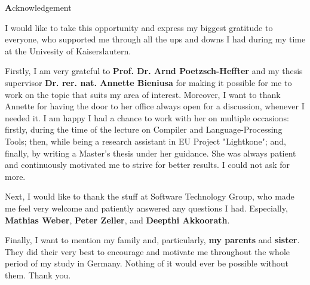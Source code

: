 
\begin{center}
{\Large \textbf Acknowledgement}
\end{center}
\vspace{1cm}

I would like to take this opportunity and express my biggest gratitude to everyone, who supported me through all the ups and downs I had during my time at the Univesity of Kaiserslautern. 

Firstly, I am very grateful to \textbf{Prof. Dr. Arnd Poetzsch-Heffter} and my thesis supervisor \textbf{Dr. rer. nat. Annette Bieniusa} for making it possible for me to work on the topic that suits my area of interest. Moreover, I want to thank Annette for having the door to her office always open for a discussion, whenever I needed it. I am happy I had a chance to work with her on multiple occasions: firstly, during the time of the lecture on Compiler and Language-Processing Tools; then, while being a research assistant in EU Project "Lightkone"; and, finally, by writing a Master's thesis under her guidance. She was always patient and continuously motivated me to strive for better results. I could not ask for more.

Next, I would like to thank the stuff at Software Technology Group, who made me feel very welcome and patiently answered any questions I had. Especially, \textbf{Mathias Weber}, \textbf{Peter Zeller}, and \textbf{Deepthi Akkoorath}.

Finally, I want to mention my family and, particularly, \textbf{my parents} and \textbf{sister}. They did their very best to encourage and motivate me throughout the whole period of my study in Germany. Nothing of it would ever be possible without them. Thank you.
